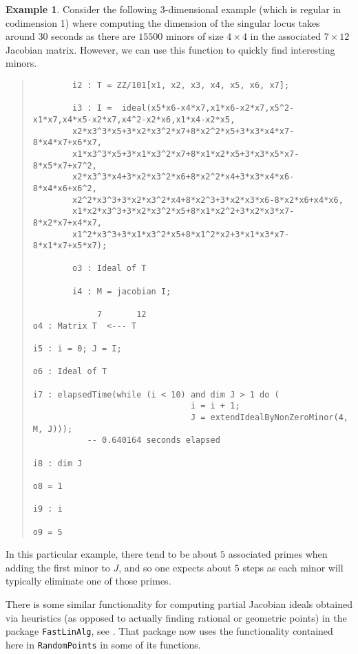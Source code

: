 \documentclass[11pt]{amsart}
\theoremstyle{definition}
\newtheorem{example}{Example}[section]
\begin{document}
\begin{example}
    Consider the following 3-dimensional example (which is regular in codimension 1) where computing the dimension of the singular locus takes around $30$ seconds as there are $15500$ minors of size $4 \times 4$ in the associated $7 \times 12$ Jacobian matrix.  However, we can use this function to quickly find interesting minors.
  {{\small\color{blue}
  \begin{quote}
\begin{verbatim}
		i2 : T = ZZ/101[x1, x2, x3, x4, x5, x6, x7];
		
		i3 : I =  ideal(x5*x6-x4*x7,x1*x6-x2*x7,x5^2-x1*x7,x4*x5-x2*x7,x4^2-x2*x6,x1*x4-x2*x5,
		x2*x3^3*x5+3*x2*x3^2*x7+8*x2^2*x5+3*x3*x4*x7-8*x4*x7+x6*x7,
		x1*x3^3*x5+3*x1*x3^2*x7+8*x1*x2*x5+3*x3*x5*x7-8*x5*x7+x7^2,
		x2*x3^3*x4+3*x2*x3^2*x6+8*x2^2*x4+3*x3*x4*x6-8*x4*x6+x6^2,
		x2^2*x3^3+3*x2*x3^2*x4+8*x2^3+3*x2*x3*x6-8*x2*x6+x4*x6,
		x1*x2*x3^3+3*x2*x3^2*x5+8*x1*x2^2+3*x2*x3*x7-8*x2*x7+x4*x7,
		x1^2*x3^3+3*x1*x3^2*x5+8*x1^2*x2+3*x1*x3*x7-8*x1*x7+x5*x7);
		
		o3 : Ideal of T
		
		i4 : M = jacobian I;

             7       12
o4 : Matrix T  <--- T          

i5 : i = 0; J = I;

o6 : Ideal of T

i7 : elapsedTime(while (i < 10) and dim J > 1 do (
                                i = i + 1;                       
                                J = extendIdealByNonZeroMinor(4, M, J)));
           -- 0.640164 seconds elapsed        

i8 : dim J

o8 = 1

i9 : i

o9 = 5
\end{verbatim}
\end{quote}
    }}    
    \noindent
    In this particular example, there tend to be about $5$ associated primes when adding the first minor to $J$, and so one expects about $5$ steps as each minor will typically eliminate one of those primes.
\end{example} 

There is some similar functionality for computing partial Jacobian ideals obtained via heuristics (as opposed to actually finding rational or geometric points) in the package {\tt FastLinAlg}, see \cite{FastLinAlgSource}.  That package now uses the functionality contained here in {\tt RandomPoints} in some of its functions.
\end{document}
